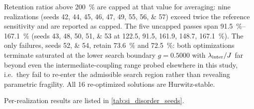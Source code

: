 \documentclass[aps,prxquantum,preprint,superscriptaddress,amsmath,amssymb]{revtex4-2}
\newcommand{\lint}{\lambda_{\rm inter}}
\begin{document}
Retention ratios above \qty{200}{\percent} are capped at that value for averaging: nine realizations (seeds \numlist{42;44;45;46;47;49;55;56;57}) exceed twice the reference sensitivity and are reported as capped. The five uncapped passes span \qtyrange{91.5}{167.1}{\percent} (seeds \numlist{43;48;50;51;53} at \num{122.5}, \num{91.5}, \num{161.9}, \num{148.7}, \qty{167.1}{\percent}). The only failures, seeds \numlist{52;54}, retain \qty{73.6}{\percent} and \qty{72.5}{\percent}: both optimizations terminate saturated at the lower search boundary $g=\num{0.5000}$ with $\lint/J$ far beyond even the intermediate-coupling range probed elsewhere in this study, i.e.\ they fail to re-enter the admissible search region rather than revealing parametric fragility. All 16 re-optimized solutions are Hurwitz-stable.

Per-realization results are listed in \cref{tab:si_disorder_seeds}.
\end{document}
